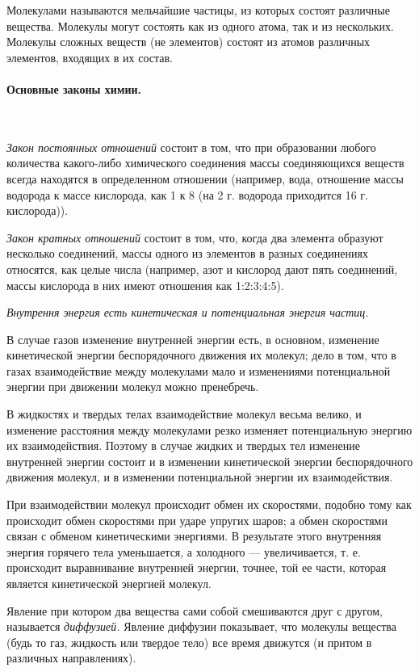\documentclass[a4paper,12pt]{article}
\begin{document}
		Молекулами называются мельчайшие частицы, из которых состоят различные вещества. 
		Молекулы могут состоять как из одного атома, так и из нескольких. Молекулы сложных
		веществ (не элементов) состоят из атомов различных элементов, входящих в их состав.

		\paragraph{Основные законы химии.} \

		\textit{Закон постоянных отношений} состоит в том, что при образовании любого
		количества какого-либо химического соединения массы соединяющихся веществ всегда
		находятся в определенном отношении (например, вода, отношение массы водорода к
		массе кислорода, как 1 к 8 (на 2 г. водорода приходится 16 г. кислорода)).

		\textit{Закон кратных отношений} состоит в том, что, когда два элемента образуют
		несколько соединений, массы одного из элементов в разных соединениях относятся,
		как целые числа (например, азот и кислород дают пять соединений, массы кислорода
		в них имеют отношения как 1:2:3:4:5).

		\textit{Внутрення энергия есть кинетическая и потенциальная энергия частиц.}

		В случае газов изменение внутренней энергии есть, в основном, изменение кинетической
		энергии беспорядочного движения их молекул; дело в том, что в газах взаимодействие 
		между молекулами мало и изменениями потенциальной энергии при движении молекул можно 
		пренебречь. 
		
		В жидкостях и твердых телах взаимодействие молекул весьма велико, и изменение
		расстояния между молекулами резко изменяет потенциальную энергию их взаимодействия. 
		Поэтому в случае жидких и твердых тел изменение внутренней энергии состоит и в изменении
		кинетической энергии беспорядочного движения молекул, и в изменении потенциальной энергии
		их взаимодействия.

		При взаимодействии молекул происходит обмен их скоростями, подобно тому как происходит
		обмен скоростями при ударе упругих шаров; а обмен скоростями связан с обменом кинетическими
		энергиями. В результате этого внутренняя энергия горячего тела уменьшается, а холодного — 
		увеличивается, т. е. происходит выравнивание внутренней энергии, точнее, той ее части, 
		которая является кинетической энергией молекул.
		
		Явление при котором два вещества сами собой смешиваются друг с другом, называется 
		\textit{диффузией.} Явление диффузии показывает, что молекулы вещества (будь то газ, 
		жидкость или твердое тело) все время движутся (и притом в различных направлениях).
\end{document}
